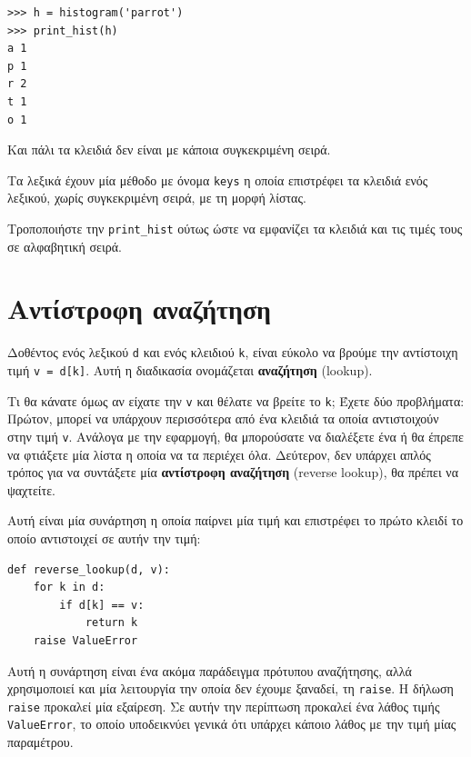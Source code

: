 \documentclass[10pt]{book}
\begin{document}
\begin{verbatim}
>>> h = histogram('parrot')
>>> print_hist(h)
a 1
p 1
r 2
t 1
o 1
\end{verbatim}
%
Και πάλι τα κλειδιά δεν είναι με κάποια συγκεκριμένη σειρά.
\\
\begin{exercise}

Τα λεξικά έχουν μία μέθοδο με όνομα {\tt keys} η οποία επιστρέφει τα κλειδιά ενός λεξικού, χωρίς συγκεκριμένη σειρά, με τη μορφή λίστας.

Τροποποιήστε την \verb"print_hist" ούτως ώστε να εμφανίζει τα κλειδιά και τις τιμές τους σε αλφαβητική σειρά.
\end{exercise}


\section{Αντίστροφη αναζήτηση}
\label{raise}

Δοθέντος ενός λεξικού {\tt d} και ενός κλειδιού {\tt k}, είναι εύκολο να βρούμε την αντίστοιχη τιμή {\tt v = d[k]}. Αυτή η διαδικασία ονομάζεται {\bf αναζήτηση} (lookup).

Τι θα κάνατε όμως αν είχατε την {\tt v} και θέλατε να βρείτε το {\tt k}; Έχετε δύο προβλήματα: Πρώτον, μπορεί να υπάρχουν περισσότερα από ένα κλειδιά τα οποία αντιστοιχούν στην τιμή {\tt v}. Ανάλογα με την εφαρμογή, θα μπορούσατε να διαλέξετε ένα ή θα έπρεπε να φτιάξετε μία λίστα η οποία να τα περιέχει όλα. Δεύτερον, δεν υπάρχει απλός τρόπος για να συντάξετε μία {\bf αντίστροφη αναζήτηση} (reverse lookup), θα πρέπει να ψαχτείτε.

Αυτή είναι μία συνάρτηση η οποία παίρνει μία τιμή και επιστρέφει το πρώτο κλειδί το οποίο αντιστοιχεί σε αυτήν την τιμή:

\begin{verbatim}
def reverse_lookup(d, v):
    for k in d:
        if d[k] == v:
            return k
    raise ValueError
\end{verbatim}
%
Αυτή η συνάρτηση είναι ένα ακόμα παράδειγμα πρότυπου αναζήτησης, αλλά χρησιμοποιεί και μία λειτουργία την οποία δεν έχουμε ξαναδεί, τη {\tt raise}. Η δήλωση {\tt raise} προκαλεί μία εξαίρεση. Σε αυτήν την περίπτωση προκαλεί ένα λάθος τιμής {\tt ValueError}, το οποίο υποδεικνύει γενικά ότι υπάρχει κάποιο λάθος με την τιμή μίας παραμέτρου.
\end{document}
